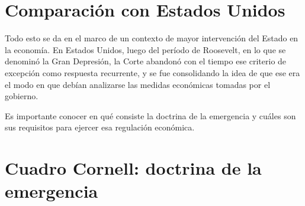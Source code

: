 \documentclass[12pt,oneside]{book}
\begin{document}
\section{Comparación con Estados Unidos}

Todo esto se da en el marco de un contexto de mayor intervención del Estado en la economía. En Estados Unidos, luego del período de Roosevelt, en lo que se denominó la Gran Depresión, la Corte abandonó con el tiempo ese criterio de excepción como respuesta recurrente, y se fue consolidando la idea de que ese era el modo en que debían analizarse las medidas económicas tomadas por el gobierno.

\begin{note}
Es importante conocer en qué consiste la doctrina de la emergencia y cuáles son sus requisitos para ejercer esa regulación económica.
\end{note}

\section{Cuadro Cornell: doctrina de la emergencia}
\end{document}
